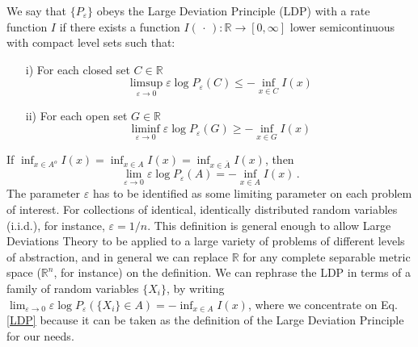 \documentclass[twocolumn,aps,reprint, nofootinbib]{revtex4}
\begin{document}
We say that $\{P_{\varepsilon}\}$ obeys the Large Deviation Principle (LDP) with a rate function $I$ if there exists a function $I(\, \cdot \, ) : \mathbb{R} \to [0, \infty]$ lower semicontinuous with compact level sets such that:
\begin{itemize}
\item[i)] For each closed set $C \in \mathbb{R}$
\begin{displaymath}
\limsup_{\varepsilon \to 0} \varepsilon \log P_{\varepsilon} (C) \leq - \inf_{x \in C} I(x)
\end{displaymath}
\item[ii)] For each open set $G \in \mathbb{R}$
\begin{displaymath}
\liminf_{\varepsilon \to 0} \varepsilon \log P_{\varepsilon} (G) \geq - \inf_{x \in G} I(x)
\end{displaymath}
\end{itemize}
If $\inf_{x \in A^o} I(x) = \inf_{x \in A} I(x) = \inf_{x \in \bar{A}} I(x)$, then
\begin{equation}
\label{LDP}
\lim_{\varepsilon \to 0} \varepsilon \log P_{\varepsilon} (A) = - \inf_{x \in A} I(x) \, .
\end{equation}
The parameter $\varepsilon$ has to be identified as some limiting parameter on each problem of interest. For collections of identical, identically distributed random variables (i.i.d.), for instance, $\varepsilon = 1/n$. This definition is general enough to allow Large Deviations Theory to be applied to a large variety of problems of different levels of abstraction, and in general we can replace $\mathbb{R}$ for any complete separable metric space ($\mathbb{R}^n$, for instance) on the definition. We can rephrase the LDP in terms of a family of random variables $\{X_i\}$, by writing $\lim_{\varepsilon \to 0} \varepsilon \log P_{\varepsilon} (\{X_i \} \in A) = - \inf_{x \in A} I(x)$, where we concentrate on Eq. \eqref{LDP} because it can be taken as the definition of the Large Deviation Principle for our needs.
\end{document}
